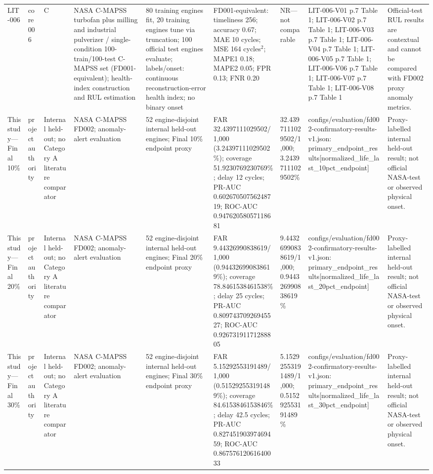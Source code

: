\begin{table}[t]
\begin{tabular}{p{}p{}p{}p{}p{}p{}p{}p{}p{}}
LIT-006 & core006 & C & NASA C-MAPSS turbofan plus milling and industrial pulverizer / single-condition 100-train/100-test C-MAPSS set (FD001-equivalent); health-index construction and RUL estimation & 80 training engines fit, 20 training engines tune via truncation; 100 official test engines evaluate; labels/onset: continuous reconstruction-error health index; no binary onset & FD001-equivalent: timeliness 256; accuracy 0.67; MAE 10 cycles; MSE 164 cycles$^2$; MAPE1 0.18; MAPE2 0.05; FPR 0.13; FNR 0.20 & NR---not comparable & LIT-006-V01 p.7 Table 1; LIT-006-V02 p.7 Table 1; LIT-006-V03 p.7 Table 1; LIT-006-V04 p.7 Table 1; LIT-006-V05 p.7 Table 1; LIT-006-V06 p.7 Table 1; LIT-006-V07 p.7 Table 1; LIT-006-V08 p.7 Table 1 & Official-test RUL results are contextual and cannot be compared with FD002 proxy anomaly metrics. \\
This study---Final 10\% & project authority & Internal held-out; no Category A literature comparator & NASA C-MAPSS FD002; anomaly-alert evaluation & 52 engine-disjoint internal held-out engines; Final 10\% endpoint proxy & FAR 32.4397111029502/1,000 (3.24397111029502\%); coverage 51.9230769230769\%; delay 12 cycles; PR-AUC 0.60267050756248719; ROC-AUC 0.94762058057118681 & 32.4397111029502/1,000; 3.24397111029502\% & configs/evaluation/fd002-confirmatory-results-v1.json: primary\_endpoint\_results[normalized\_life\_last\_10pct\_endpoint] & Proxy-labelled internal held-out result; not official NASA-test or observed physical onset. \\
This study---Final 20\% & project authority & Internal held-out; no Category A literature comparator & NASA C-MAPSS FD002; anomaly-alert evaluation & 52 engine-disjoint internal held-out engines; Final 20\% endpoint proxy & FAR 9.44326990838619/1,000 (0.944326990838619\%); coverage 78.8461538461538\%; delay 25 cycles; PR-AUC 0.80974370926945527; ROC-AUC 0.92673191171288805 & 9.44326990838619/1,000; 0.944326990838619\% & configs/evaluation/fd002-confirmatory-results-v1.json: primary\_endpoint\_results[normalized\_life\_last\_20pct\_endpoint] & Proxy-labelled internal held-out result; not official NASA-test or observed physical onset. \\
This study---Final 30\% & project authority & Internal held-out; no Category A literature comparator & NASA C-MAPSS FD002; anomaly-alert evaluation & 52 engine-disjoint internal held-out engines; Final 30\% endpoint proxy & FAR 5.15292553191489/1,000 (0.515292553191489\%); coverage 84.6153846153846\%; delay 42.5 cycles; PR-AUC 0.82745190397469459; ROC-AUC 0.86757612061640033 & 5.15292553191489/1,000; 0.515292553191489\% & configs/evaluation/fd002-confirmatory-results-v1.json: primary\_endpoint\_results[normalized\_life\_last\_30pct\_endpoint] & Proxy-labelled internal held-out result; not official NASA-test or observed physical onset. \\

\end{tabular}
\end{table}
